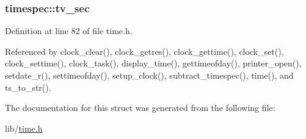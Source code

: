 \hypertarget{structtimespec_afc3302668d7cb5952f590da69fdd4955}{
\subsubsection[{tv\-\_\-sec}]{ timespec\-::tv\-\_\-sec}}\label{structtimespec_afc3302668d7cb5952f590da69fdd4955}


Definition at line 82 of file time.\-h.



Referenced by clock\-\_\-clear(), clock\-\_\-getres(), clock\-\_\-gettime(), clock\-\_\-set(), clock\-\_\-settime(), clock\-\_\-task(), display\-\_\-time(), gettimeofday(), printer\-\_\-open(), setdate\-\_\-r(), settimeofday(), setup\-\_\-clock(), subtract\-\_\-timespec(), time(), and ts\-\_\-to\-\_\-str().



The documentation for this struct was generated from the following file\-:\begin{DoxyCompactItemize}
\item 
lib/\hyperlink{time_8h}{time.\-h}\end{DoxyCompactItemize}
